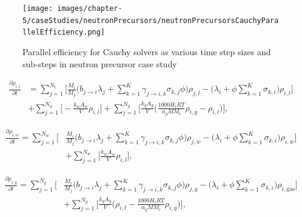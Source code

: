 \clearpage

\begin{figure}
    \centering
    \texttt{[image: images/chapter-5/caseStudies/neutronPrecursors/neutronPrecursorsCauchyParallelEfficiency.png]}
    \caption{Parallel efficiency for Cauchy solvers as various time step sizes and sub-steps in neutron precursor case study}
    \label{fig:neutron_precursors_cauchy_parallel_eff}
\end{figure}

\clearpage

\begin{equation}
\begin{split}
    \frac{\partial \rho_{i,l}}{\partial t}
    &=
    \sum_{j=1}^{N_{l}}\bigg[\frac{M_{i}}{M_{j}}\bigg(b_{j\rightarrow i}\lambda_{j} + 
    \sum_{k=1}^{K}\gamma_{j\rightarrow i,k}\sigma_{k,j}\phi \bigg)\rho_{j,l}
    - \bigg(\lambda_{i} + \phi\sum_{k=1}^{K} \sigma_{k,i}\bigg)\rho_{i, l} \bigg]\\ &+ \sum_{j=1}^{N_{w}} \bigg[-\frac{k_{w}A_{w}}{V}\rho_{i,l} \bigg] + \sum_{j=1}^{N_{g}} \bigg[  \frac{k_{g}A_{g}}{V}\bigg(\frac{1000H_{i}RT}{\alpha_{g}MM_{i}}\rho_{i, g} - \rho_{i,l}\bigg) \bigg],
    \label{eq:MSRLumpDepletionSmallLiquidPhase}
\end{split}
\end{equation}

\begin{equation}
\begin{split}
    \frac{\partial \rho_{i,w}}{\partial t} = \sum_{j=1}^{N_{w}}\bigg[&\frac{M_{i}}{M_{j}}\bigg(b_{j\rightarrow i}\lambda_{j} + 
    \sum_{k=1}^{K}\gamma_{j\rightarrow i,k}\sigma_{k,j}\phi \bigg)\rho_{j, w}
    - \bigg(\lambda_{i} + \phi\sum_{k=1}^{K} \sigma_{k,i}\bigg)\rho_{i, w} \bigg]\\ &+ \sum_{j=1}^{N_{w}} \bigg[\frac{k_{w}A_{w}}{V}\rho_{i,l} \bigg],
    \label{eq:MSRLumpDepletionSmallWallPhase}
\end{split}
\end{equation}

\begin{equation}
\begin{split}
    \frac{\partial \rho_{i,g}}{\partial t}
    =
    \sum_{j=1}^{N_{g}}\bigg[&\frac{M_{i}}{M_{j}}\bigg(b_{j\rightarrow i}\lambda_{j} + 
    \sum_{k=1}^{K}\gamma_{j\rightarrow i,k}\sigma_{k,j}\phi \bigg)\rho_{j, g}
    - \bigg(\lambda_{i} + \phi\sum_{k=1}^{K} \sigma_{k,i}\bigg)\rho_{i, \text{gas}} \bigg]\\ & + \sum_{j=1}^{N_{g}} \bigg[  \frac{k_{g}A_{g}}{V}\bigg(\rho_{i,l} - \frac{1000H_{i}RT}{\alpha_{g}MM_{i}}\rho_{i, g}\bigg) \bigg],
    \label{eq:MSRLumpDepletionSmallGasPhase}
\end{split}
\end{equation}

